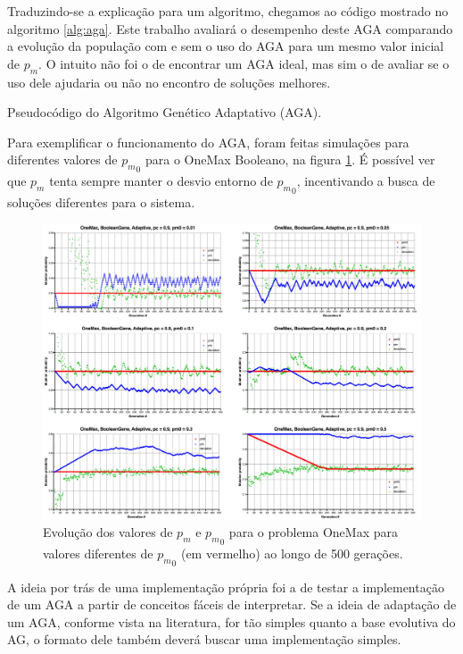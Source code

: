 Traduzindo-se a explicação para um algoritmo, chegamos ao código mostrado no algoritmo \ref{alg:aga}. Este trabalho avaliará o desempenho deste AGA comparando a evolução da população com e sem o uso do AGA para um mesmo valor inicial de $p_m$. O intuito não foi o de encontrar um AGA ideal, mas sim o de avaliar se o uso dele ajudaria ou não no encontro de soluções melhores.

\begin{algorithm}[ht]
\caption{Pseudocódigo do Algoritmo Genético Adaptativo (AGA).}
\label{alg:aga}
\end{algorithm}

Para exemplificar o funcionamento do AGA, foram feitas simulações para diferentes valores de ${p_m}_0$ para o OneMax Booleano, na figura \ref{fig:aga_test}. É possível ver que $p_m$ tenta sempre manter o desvio entorno de ${p_m}_0$, incentivando a busca de soluções diferentes para o sistema.

\begin{figure}[ht!]
    \centering \includegraphics[width=1.0\textwidth]{boolean_onemax_aga.jpg}
    \caption{Evolução dos valores de $p_m$ e ${p_m}_0$ para o problema OneMax para valores diferentes de ${p_m}_0$ (em vermelho) ao longo de 500 gerações.}
    \label{fig:aga_test}
\end{figure}

A ideia por trás de uma implementação própria foi a de testar a implementação de um AGA a partir de conceitos fáceis de interpretar. Se a ideia de adaptação de um AGA, conforme vista na literatura, for tão simples quanto a base evolutiva do AG, o formato dele também deverá buscar uma implementação simples.

